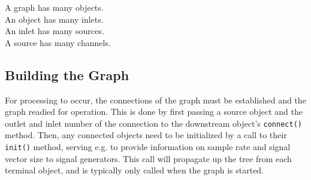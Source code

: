 \documentclass[twoside,a4paper]{article}
\begin{document}
				A graph has many objects.\\
\indent	An object has many inlets.\\
\indent	An inlet has many sources.\\
\indent	A source has many channels.\\




\subsection{Building the Graph} %

For processing to occur, the connections of the graph must be established and the graph readied for operation.  This is done by first passing a source object and the outlet and inlet number of the connection to the downstream object's \texttt{connect()} method.  Then, any connected objects need to be initialized by a call to their \texttt{init()} method, serving e.g. to provide information on sample rate and signal vector size to signal generators.  This call will propagate up the tree from each terminal object, and is typically only called when the graph is started.

%
% 
% 

\end{document}
